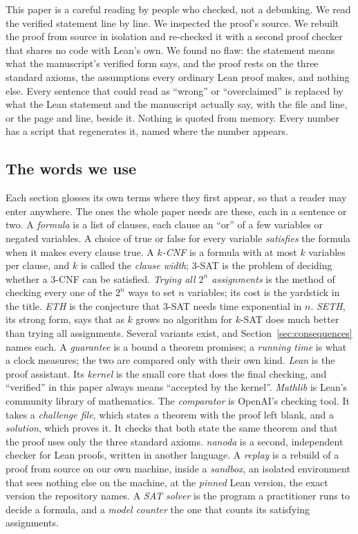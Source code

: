 This paper is a careful reading by people who checked, not a debunking.
We read the verified statement line by line. We inspected the proof's
source. We rebuilt the proof from source in isolation and re-checked it
with a second proof checker that shares no code with Lean's own. We
found no flaw: the statement means what the manuscript's verified form
says, and the proof rests on the three standard axioms, the assumptions
every ordinary Lean proof makes, and nothing else. Every sentence that
could read as ``wrong'' or ``overclaimed'' is replaced by what the Lean
statement and the manuscript actually say, with the file and line, or
the page and line, beside it. Nothing is quoted from memory. Every
number has a script that regenerates it, named where the number
appears.

\subsection{The words we use}
\label{sec:intro-words}

Each section glosses its own terms where they first appear, so that a
reader may enter anywhere. The ones the whole paper needs are these,
each in a sentence or two.
A \emph{formula} is a list of clauses, each clause an ``or'' of a few
variables or negated variables. A choice of true or false for every
variable \emph{satisfies} the formula when it makes every clause true.
A \emph{$k$-CNF} is a formula with at most $k$ variables per clause,
and $k$ is called the \emph{clause width}; 3-SAT is the problem of
deciding whether a 3-CNF can be satisfied.
\emph{Trying all $2^n$ assignments} is the method of checking every one
of the $2^n$ ways to set $n$ variables; its cost is the yardstick in the
title.
\emph{ETH} is the conjecture that 3-SAT needs time exponential in $n$.
\emph{SETH}, its strong form, says that as $k$ grows no algorithm for
$k$-SAT does much better than trying all assignments. Several variants
exist, and Section~\ref{sec:consequences} names each.
A \emph{guarantee} is a bound a theorem promises; a \emph{running time}
is what a clock measures; the two are compared only with their own
kind.
\emph{Lean} is the proof assistant. Its \emph{kernel} is the small core
that does the final checking, and ``verified'' in this paper always
means ``accepted by the kernel''. \emph{Mathlib} is Lean's community
library of mathematics.
The \emph{comparator} is OpenAI's checking tool. It takes a
\emph{challenge file}, which states a theorem with the proof left
blank, and a \emph{solution}, which proves it. It checks that both
state the same theorem and that the proof uses only the three standard
axioms.
\emph{nanoda} \citep{Nanoda} is a second, independent checker for Lean proofs, written
in another language. A \emph{replay} is a rebuild of a proof from
source on our own machine, inside a \emph{sandbox}, an isolated
environment that sees nothing else on the machine, at the \emph{pinned}
Lean version, the exact version the repository names.
A \emph{SAT solver} is the program a practitioner runs to decide a
formula, and a \emph{model counter} the one that counts its satisfying
assignments.


